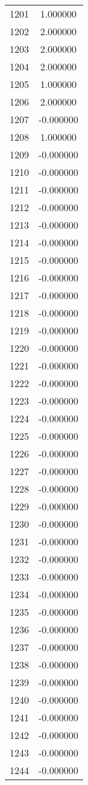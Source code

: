 \documentclass[12pt]{article}
\begin{document}
\begin{longtable}{@{}cc@{}}
1201 & 1.000000 \\
1202 & 2.000000 \\
1203 & 2.000000 \\
1204 & 2.000000 \\
1205 & 1.000000 \\
1206 & 2.000000 \\
1207 & -0.000000 \\
1208 & 1.000000 \\
1209 & -0.000000 \\
1210 & -0.000000 \\
1211 & -0.000000 \\
1212 & -0.000000 \\
1213 & -0.000000 \\
1214 & -0.000000 \\
1215 & -0.000000 \\
1216 & -0.000000 \\
1217 & -0.000000 \\
1218 & -0.000000 \\
1219 & -0.000000 \\
1220 & -0.000000 \\
1221 & -0.000000 \\
1222 & -0.000000 \\
1223 & -0.000000 \\
1224 & -0.000000 \\
1225 & -0.000000 \\
1226 & -0.000000 \\
1227 & -0.000000 \\
1228 & -0.000000 \\
1229 & -0.000000 \\
1230 & -0.000000 \\
1231 & -0.000000 \\
1232 & -0.000000 \\
1233 & -0.000000 \\
1234 & -0.000000 \\
1235 & -0.000000 \\
1236 & -0.000000 \\
1237 & -0.000000 \\
1238 & -0.000000 \\
1239 & -0.000000 \\
1240 & -0.000000 \\
1241 & -0.000000 \\
1242 & -0.000000 \\
1243 & -0.000000 \\
1244 & -0.000000 \\

\end{longtable}
\end{document}
